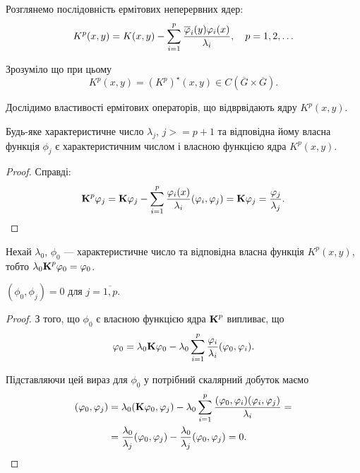 Розглянемо послідовність ермітових неперервних ядер:
\begin{equation}
    K^p(x, y) = K(x, y) - \Sum_{i = 1}^p \dfrac{\overline \phi_i(y) \phi_i(x)}{\lambda_i}, \quad p = 1, 2, \ldots
\end{equation}

Зрозуміло що при цьому
\begin{equation}
    K^p(x, y) = (K^p)^\star (x, y) \in  C\left(\overline G \times \overline G\right).
\end{equation}

Дослідимо властивості  ермітових операторів, що відврвідають ядру $K^p(x, y)$.

\begin{proposition}
    Будь-яке характеристичне число $\lambda_j$, $j >= p + 1$ та відповідна йому власна функція $\phi_j$ є характеристичним числом і власною функцією ядра $K^p(x,y)$.
\end{proposition}

\begin{proof}
    Справді:
    \begin{equation}
        \bf{K}^p \phi_j = \bf{K} \phi_j - \Sum_{i = 1}^p \dfrac{\phi_i(x)}{\lambda_i} (\phi_i, \phi_j) = \bf{K} \phi_j = \dfrac{\phi_j}{\lambda_j}.
    \end{equation}
\end{proof}

Нехай $\lambda_0$, $\phi_0$ --- характеристичне число та відповідна власна функція $K^p(x, y)$, тобто $\lambda_0 \bf{K}^p \phi_0 = \phi_0$.

\begin{proposition}
    $(\phi_0, \phi_j) = 0$ для $j = \overline{1, p}$.
\end{proposition}

\begin{proof}
    З того, що $\phi_0$ є власною функцією ядра $\bf{K}^p$ випливає, що
    \begin{equation}
        \phi_0 = \lambda_0 \bf{K} \phi_0 - \lambda_0 \Sum_{i = 1}^p \dfrac{\phi_i}{\lambda_i} (\phi_0, \phi_i).
    \end{equation}

    Підставляючи цей вираз для $\phi_0$ у потрібний скалярний добуток маємо
    \begin{equation}
        \begin{aligned}
            (\phi_0, \phi_j) &= \lambda_0 (\bf{K} \phi_0, \phi_j) - \lambda_0 \Sum_{i = 1}^p \dfrac{(\phi_0, \phi_i)(\phi_i, \phi_j)}{\lambda_i} = \\
            &= \dfrac{\lambda_0}{\lambda_j} (\phi_0, \phi_j) - \dfrac{\lambda_0}{\lambda_j} (\phi_0, \phi_j) = 0. 
        \end{aligned}
    \end{equation}
\end{proof}

